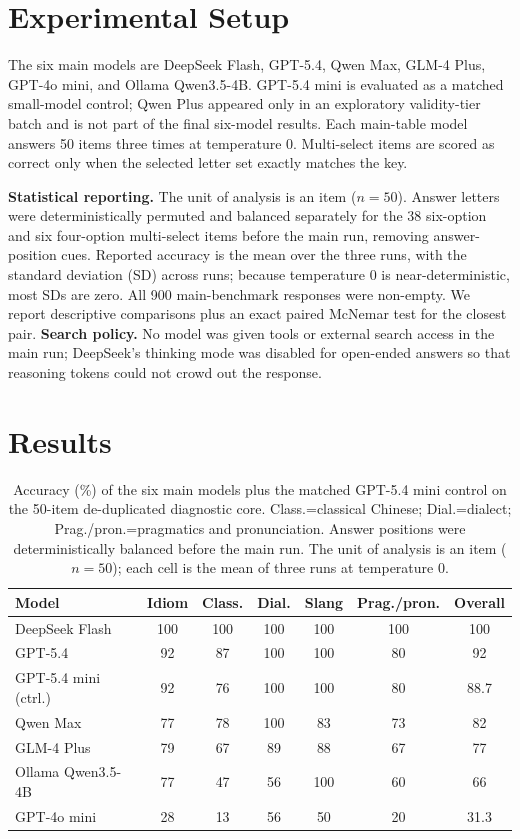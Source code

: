 \documentclass[11pt]{article}
\begin{document}
\section{Experimental Setup}

The six main models are DeepSeek Flash, GPT-5.4, Qwen Max, GLM-4 Plus, GPT-4o mini, and Ollama Qwen3.5-4B. GPT-5.4 mini is evaluated as a matched small-model control; Qwen Plus appeared only in an exploratory validity-tier batch and is not part of the final six-model results. Each main-table model answers 50 items three times at temperature 0. Multi-select items are scored as correct only when the selected letter set exactly matches the key.

\textbf{Statistical reporting.} The unit of analysis is an item ($n=50$). Answer letters were deterministically permuted and balanced separately for the 38 six-option and six four-option multi-select items before the main run, removing answer-position cues. Reported accuracy is the mean over the three runs, with the standard deviation (SD) across runs; because temperature 0 is near-deterministic, most SDs are zero. All 900 main-benchmark responses were non-empty. We report descriptive comparisons plus an exact paired McNemar test for the closest pair. \textbf{Search policy.} No model was given tools or external search access in the main run; DeepSeek's thinking mode was disabled for open-ended answers so that reasoning tokens could not crowd out the response.

\section{Results}

\begin{table}[t]
\centering
\scriptsize
\setlength{\tabcolsep}{2pt}
\begin{tabular}{lcccccc}
\toprule
\textbf{Model} & \textbf{Idiom} & \textbf{Class.} & \textbf{Dial.} & \textbf{Slang} & \textbf{Prag./pron.} & \textbf{Overall} \\
\midrule
DeepSeek Flash & 100 & 100 & 100 & 100 & 100 & 100 \\
GPT-5.4 & 92 & 87 & 100 & 100 & 80 & 92 \\
GPT-5.4 mini (ctrl.) & 92 & 76 & 100 & 100 & 80 & 88.7 \\
Qwen Max & 77 & 78 & 100 & 83 & 73 & 82 \\
GLM-4 Plus & 79 & 67 & 89 & 88 & 67 & 77 \\
Ollama Qwen3.5-4B & 77 & 47 & 56 & 100 & 60 & 66 \\
GPT-4o mini & 28 & 13 & 56 & 50 & 20 & 31.3 \\
\bottomrule
\end{tabular}
\caption{Accuracy (\%) of the six main models plus the matched GPT-5.4 mini control on the 50-item de-duplicated diagnostic core. Class.=classical Chinese; Dial.=dialect; Prag./pron.=pragmatics and pronunciation. Answer positions were deterministically balanced before the main run. The unit of analysis is an item ($n=50$); each cell is the mean of three runs at temperature 0.}
\label{tab:main}
\end{table}
\end{document}
